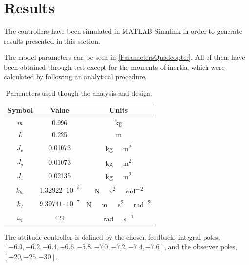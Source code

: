 \section{Results}

The controllers have been simulated in MATLAB Simulink in order to generate results presented in this section. 

The model parameters can be seen in \autoref{ParametersQuadcopter}. All of them have been obtained through test except for the moments of inertia, which were calculated by following an analytical procedure.

\begin{table}[H]
    \centering
    \begin{tabular}{c|c|c}
        \textbf{Symbol} &\textbf{Value} &\textbf{Units}\\
        \hline %
        $m$ & 0.996       &kg\\
        \hline %
        $L$  &   0.225       & m\\
        \hline %
        $J_x$  & 0.01073       & \si{kg \  m^2}\\
        \hline %
        $J_y$  & 0.01073       & \si{kg \  m^2}\\
        \hline %
        $J_z$  & 0.02135       & \si{kg \  m^2}\\
        \hline %
        $k_{th}$  & $1.32922\cdot10^{-5}$       & \si{N \  s^2 \  rad^{-2}}\\
        \hline %
        $k_{d}$  & $9.39741 \cdot10^{-7}$       & \si{N \  m \  s^2 \  rad^{-2}}\\
        \hline %
        $\overline{\omega}_i$& 429      & \si{rad \ s^{-1}}\\
        
    \end{tabular}
    \caption{Parameters used though the analysis and design.}
    \label{ParametersQuadcopter}
\end{table}
The attitude controller is defined by the chosen feedback, integral poles, $[-6.0, -6.2, -6.4, -6.6, -6.8, -7.0, -7.2, -7.4, -7.6]$, and  the observer poles, $[-20, -25, -30]$.

